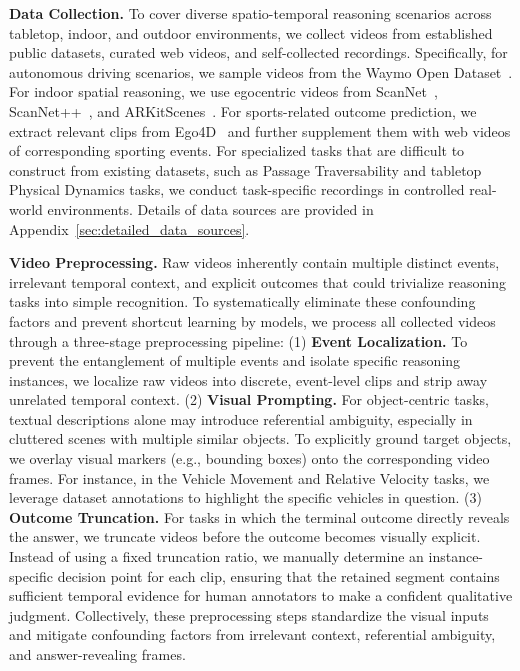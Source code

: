 \textbf{Data Collection.}
To cover diverse spatio-temporal reasoning scenarios across tabletop, indoor, and outdoor environments, we collect videos from established public datasets, curated web videos, and self-collected recordings.
Specifically, for autonomous driving scenarios, we sample videos from the Waymo Open Dataset~\citep{Waymo}. 
For indoor spatial reasoning, we use egocentric videos from ScanNet~\citep{ScanNet}, ScanNet++~\citep{ScanNet++}, and ARKitScenes~\citep{ARKitScenes}. 
For sports-related outcome prediction, we extract relevant clips from Ego4D~\citep{Ego4D} and further supplement them with web videos of corresponding sporting events. 
For specialized tasks that are difficult to construct from existing datasets, such as Passage Traversability and tabletop Physical Dynamics tasks, we conduct task-specific recordings in controlled real-world environments. 
Details of data sources are provided in Appendix~\ref{sec:detailed_data_sources}. 

\textbf{Video Preprocessing.}
Raw videos inherently contain multiple distinct events, irrelevant temporal context, and explicit outcomes that could trivialize reasoning tasks into simple recognition. 
To systematically eliminate these confounding factors and prevent shortcut learning by models, we process all collected videos through a three-stage preprocessing pipeline:
(1) \textbf{Event Localization.} 
To prevent the entanglement of multiple events and isolate specific reasoning instances, we localize raw videos into discrete, event-level clips and strip away unrelated temporal context.
(2) \textbf{Visual Prompting.} 
For object-centric tasks, textual descriptions alone may introduce referential ambiguity, especially in cluttered scenes with multiple similar objects. 
To explicitly ground target objects, we overlay visual markers (e.g., bounding boxes) onto the corresponding video frames. 
For instance, in the Vehicle Movement and Relative Velocity tasks, we leverage dataset annotations to highlight the specific vehicles in question.
(3) \textbf{Outcome Truncation.} 
For tasks in which the terminal outcome directly reveals the answer, we truncate videos before the outcome becomes visually explicit. 
Instead of using a fixed truncation ratio, we manually determine an instance-specific decision point for each clip, ensuring that the retained segment contains sufficient temporal evidence for human annotators to make a confident qualitative judgment. 
Collectively, these preprocessing steps standardize the visual inputs and mitigate confounding factors from irrelevant context, referential ambiguity, and answer-revealing frames.

